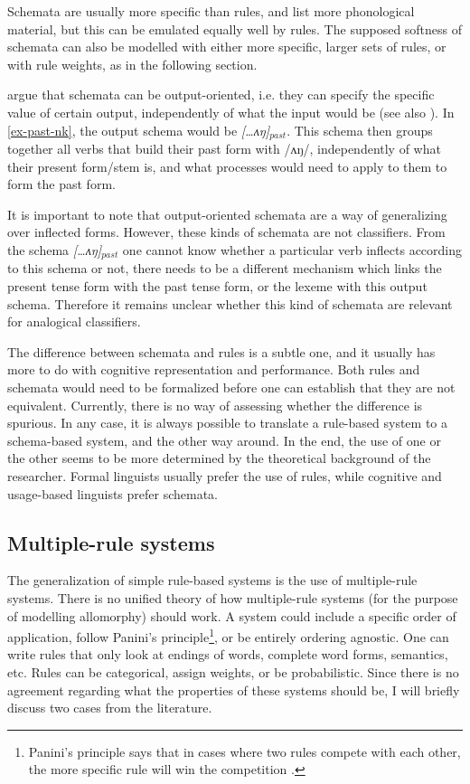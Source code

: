 Schemata are usually more specific than rules, and list more phonological material, but this can be emulated equally well by rules. The supposed softness of schemata can also be modelled with either more specific, larger sets of rules, or with rule weights, as in the following section.

\textcite[chapter 11.2-11.3]{Croft.2004} argue that schemata can be output-oriented, i.e. they can specify the specific value of certain output, independently of what the input would be (see also \cite{Bybee.1995}). In \ref{ex-past-nk}, the output schema would be \textit{[\dots ʌŋ]$_{past}$}. This schema then groups together all verbs that build their past form with /ʌŋ/, independently of what their present form/stem is, and what processes would need to apply to them to form the past form.

It is important to note that output-oriented schemata are a way of generalizing over inflected forms. However, these kinds of schemata are not classifiers. From the schema \textit{[\dots ʌŋ]$_{past}$} one cannot know whether a particular verb inflects according to this schema or not, there needs to be a different mechanism which links the present tense form with the past tense form, or the lexeme with this output schema. Therefore it remains unclear whether this kind of schemata are relevant for analogical classifiers.

The difference between schemata and rules is a subtle one, and it usually has more to do with cognitive representation and performance. Both rules and schemata would need to be formalized before one can establish that they are not equivalent. Currently, there is no way of assessing whether the difference is spurious. In any case, it is always possible to translate a rule-based system to a schema-based system, and the other way around. In the end, the use of one or the other seems to be more determined by the theoretical background of the researcher. Formal linguists usually prefer the use of rules, while cognitive and usage-based linguists prefer schemata.


\subsection{Multiple-rule systems}


The generalization of simple rule-based systems is the use of multiple-rule systems. There is no unified theory of how multiple-rule systems (for the purpose of modelling allomorphy) should work. A system could include a specific order of application, follow Panini's principle\footnote{Panini's principle says that in cases where two rules compete with each other, the more specific rule will win the competition \autocite{Zwicky.1986}.}, or be entirely ordering agnostic. One can write rules that only look at endings of words, complete word forms, semantics, etc. Rules can be categorical, assign weights, or be probabilistic.  Since there is no agreement regarding what the properties of these systems should be, I will briefly discuss two cases from the literature.

